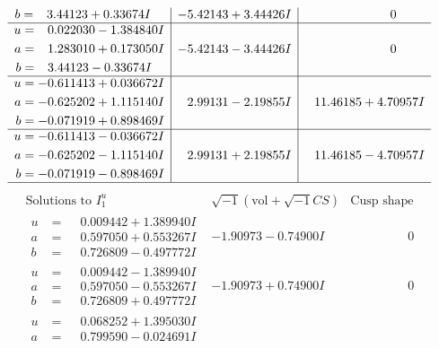 \documentclass[1p]{elsarticle_modified}
\theoremstyle{definition}
\newcommand{\I}{\sqrt{-1}}
\begin{document}
$$\begin{array}{c|c|c}
\begin{aligned}
b &= \phantom{-}3.44123 + 0.33674 I\end{aligned}
 & -5.42143 + 3.44426 I & \phantom{-0.000000 } 0 \\ \hline\begin{aligned}
u &= \phantom{-}0.022030 - 1.384840 I \\
a &= \phantom{-}1.283010 + 0.173050 I \\
b &= \phantom{-}3.44123 - 0.33674 I\end{aligned}
 & -5.42143 - 3.44426 I & \phantom{-0.000000 } 0 \\ \hline\begin{aligned}
u &= -0.611413 + 0.036672 I \\
a &= -0.625202 + 1.115140 I \\
b &= -0.071919 + 0.898469 I\end{aligned}
 & \phantom{-}2.99131 - 2.19855 I & \phantom{-}11.46185 + 4.70957 I \\ \hline\begin{aligned}
u &= -0.611413 - 0.036672 I \\
a &= -0.625202 - 1.115140 I \\
b &= -0.071919 - 0.898469 I\end{aligned}
 & \phantom{-}2.99131 + 2.19855 I & \phantom{-}11.46185 - 4.70957 I\\
 \hline 
 \end{array}$$\newpage$$\begin{array}{c|c|c}  
\text{Solutions to }I^u_{1}& \I (\text{vol} + \sqrt{-1}CS) & \text{Cusp shape}\\
 \hline 
\begin{aligned}
u &= \phantom{-}0.009442 + 1.389940 I \\
a &= \phantom{-}0.597050 + 0.553267 I \\
b &= \phantom{-}0.726809 - 0.497772 I\end{aligned}
 & -1.90973 - 0.74900 I & \phantom{-0.000000 } 0 \\ \hline\begin{aligned}
u &= \phantom{-}0.009442 - 1.389940 I \\
a &= \phantom{-}0.597050 - 0.553267 I \\
b &= \phantom{-}0.726809 + 0.497772 I\end{aligned}
 & -1.90973 + 0.74900 I & \phantom{-0.000000 } 0 \\ \hline\begin{aligned}
u &= \phantom{-}0.068252 + 1.395030 I \\
a &= \phantom{-}0.799590 - 0.024691 I \\

\end{aligned}
\end{array}$$
\end{document}
